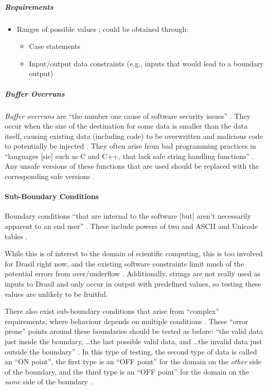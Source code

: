 \subparagraph{Requirements}
\begin{itemize}
      \item Ranges of possible values \cite[p.~67, 73]{patton_software_2006};
            could be obtained through:
            \begin{itemize}
                  \item Case statements
                  \item Input/output data constraints (e.g., inputs that
                        would lead to a boundary output)
            \end{itemize}
\end{itemize}

\subparagraph{Buffer Overruns \cite[p.~201-205]{patton_software_2006}}

\emph{Buffer overruns} are ``the number one cause of software security issues''
\cite[p.~75]{patton_software_2006}. They occur when the size of the destination
for some data is smaller than the data itself, causing existing data (including
code) to be overwritten and malicious code to potentially be injected
\cite[p.~202, 204-205]{patton_software_2006}. They often arise from bad
programming practices in ``languages [sic] such as C and C++, that lack safe
string handling functions'' \cite[p.~201]{patton_software_2006}. Any unsafe
versions of these functions that are used should be replaced with the
corresponding safe versions \cite[p.~203-204]{patton_software_2006}.

\paragraph{Sub-Boundary Conditions \cite[p.~75-77]{patton_software_2006}}
\label{sub-bound-conds}

Boundary conditions ``that are internal to the software [but] aren't necessarily
apparent to an end user'' \cite[p.~75]{patton_software_2006}. These include
powers of two \cite[p.~75-76]{patton_software_2006} and ASCII and Unicode tables
\cite[p.~76-77]{patton_software_2006}.

While this is of interest to the domain of scientific computing, this is too
involved for Drasil right now, and the existing software constraints limit much
of the potential errors from over/underflow \cite{june_11_meeting}. Additionally,
strings are not really used as inputs to Drasil and only occur in output with
predefined values, so testing these values are unlikely to be fruitful.

There also exist sub-boundary conditions that arise from ``complex''
requirements, where behaviour depends on multiple conditions
\cite[p.~430]{van_vliet_software_2000}. These ``error prone'' points around
these boundaries should be tested \cite[p.~430]{van_vliet_software_2000} as
before: ``the valid data just inside the boundary, \dots the last possible
valid data, and \dots the invalid data just outside the boundary''
\cite[p.~73]{patton_software_2006}. In this type of testing, the second type of
data is called an ``ON point'', the first type is an ``OFF point'' for the
domain on the \emph{other} side of the boundary, and the third type is an ``OFF
point'' for the domain on the \emph{same} side of the boundary
\cite[p.~430]{van_vliet_software_2000}.

